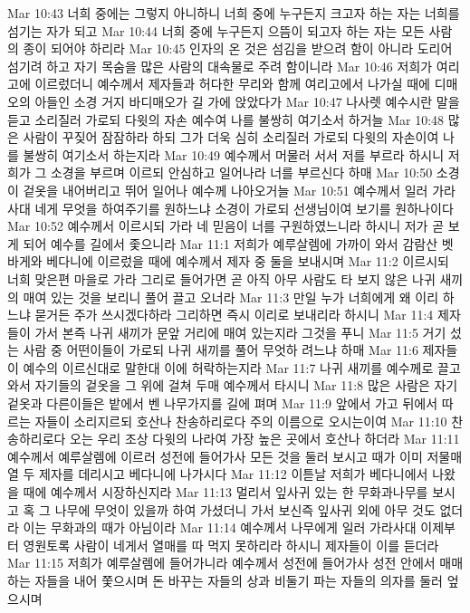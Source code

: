 Mar 10:43  너희 중에는 그렇지 아니하니 너희 중에 누구든지 크고자 하는 자는 너희를 섬기는 자가 되고
Mar 10:44  너희 중에 누구든지 으뜸이 되고자 하는 자는 모든 사람의 종이 되어야 하리라
Mar 10:45  인자의 온 것은 섬김을 받으려 함이 아니라 도리어 섬기려 하고 자기 목숨을 많은 사람의 대속물로 주려 함이니라
Mar 10:46  저희가 여리고에 이르렀더니 예수께서 제자들과 허다한 무리와 함께 여리고에서 나가실 때에 디매오의 아들인 소경 거지 바디매오가 길 가에 앉았다가
Mar 10:47  나사렛 예수시란 말을 듣고 소리질러 가로되 다윗의 자손 예수여 나를 불쌍히 여기소서 하거늘
Mar 10:48  많은 사람이 꾸짖어 잠잠하라 하되 그가 더욱 심히 소리질러 가로되 다윗의 자손이여 나를 불쌍히 여기소서 하는지라
Mar 10:49  예수께서 머물러 서서 저를 부르라 하시니 저희가 그 소경을 부르며 이르되 안심하고 일어나라 너를 부르신다 하매
Mar 10:50  소경이 겉옷을 내어버리고 뛰어 일어나 예수께 나아오거늘
Mar 10:51  예수께서 일러 가라사대 네게 무엇을 하여주기를 원하느냐 소경이 가로되 선생님이여 보기를 원하나이다
Mar 10:52  예수께서 이르시되 가라 네 믿음이 너를 구원하였느니라 하시니 저가 곧 보게 되어 예수를 길에서 좇으니라
Mar 11:1  저희가 예루살렘에 가까이 와서 감람산 벳바게와 베다니에 이르렀을 때에 예수께서 제자 중 둘을 보내시며
Mar 11:2  이르시되 너희 맞은편 마을로 가라 그리로 들어가면 곧 아직 아무 사람도 타 보지 않은 나귀 새끼의 매여 있는 것을 보리니 풀어 끌고 오너라
Mar 11:3  만일 누가 너희에게 왜 이리 하느냐 묻거든 주가 쓰시겠다하라 그리하면 즉시 이리로 보내리라 하시니
Mar 11:4  제자들이 가서 본즉 나귀 새끼가 문앞 거리에 매여 있는지라 그것을 푸니
Mar 11:5  거기 섰는 사람 중 어떤이들이 가로되 나귀 새끼를 풀어 무엇하 려느냐 하매
Mar 11:6  제자들이 예수의 이르신대로 말한대 이에 허락하는지라
Mar 11:7  나귀 새끼를 예수께로 끌고 와서 자기들의 겉옷을 그 위에 걸쳐 두매 예수께서 타시니
Mar 11:8  많은 사람은 자기 겉옷과 다른이들은 밭에서 벤 나무가지를 길에 펴며
Mar 11:9  앞에서 가고 뒤에서 따르는 자들이 소리지르되 호산나 찬송하리로다 주의 이름으로 오시는이여
Mar 11:10  찬송하리로다 오는 우리 조상 다윗의 나라여 가장 높은 곳에서 호산나 하더라
Mar 11:11  예수께서 예루살렘에 이르러 성전에 들어가사 모든 것을 둘러 보시고 때가 이미 저물매 열 두 제자를 데리시고 베다니에 나가시다
Mar 11:12  이튿날 저희가 베다니에서 나왔을 때에 예수께서 시장하신지라
Mar 11:13  멀리서 잎사귀 있는 한 무화과나무를 보시고 혹 그 나무에 무엇이 있을까 하여 가셨더니 가서 보신즉 잎사귀 외에 아무 것도 없더라 이는 무화과의 때가 아님이라
Mar 11:14  예수께서 나무에게 일러 가라사대 이제부터 영원토록 사람이 네게서 열매를 따 먹지 못하리라 하시니 제자들이 이를 듣더라
Mar 11:15  저희가 예루살렘에 들어가니라 예수께서 성전에 들어가사 성전 안에서 매매하는 자들을 내어 쫓으시며 돈 바꾸는 자들의 상과 비둘기 파는 자들의 의자를 둘러 엎으시며
